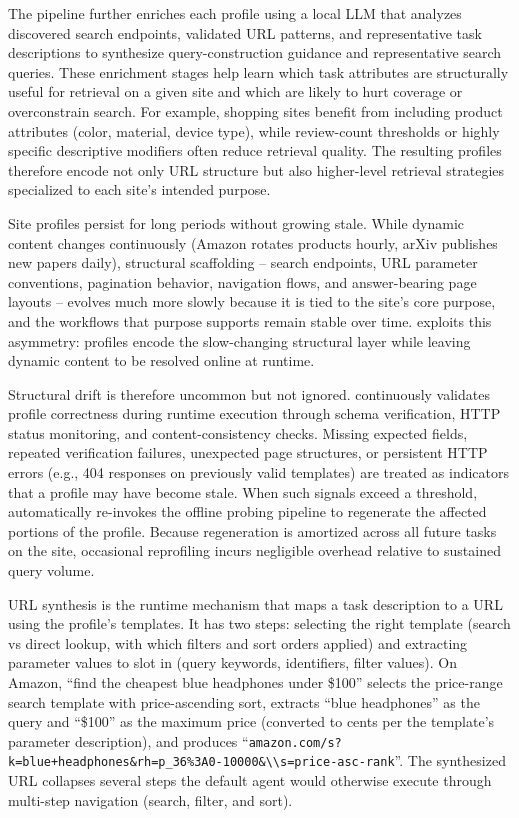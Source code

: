 The pipeline further enriches each profile using a local LLM that analyzes discovered search endpoints, validated URL patterns, and representative task descriptions to synthesize query-construction guidance and representative search queries. These enrichment stages help \sys{} learn which task attributes are structurally useful for retrieval on a given site and which are likely to hurt coverage or overconstrain search. For example, shopping sites benefit from including product attributes (color, material, device type), while review-count thresholds or highly specific descriptive modifiers often reduce retrieval quality. The resulting profiles therefore encode not only URL structure but also higher-level retrieval strategies specialized to each site's intended purpose.

 Site profiles persist for long periods without growing stale. While dynamic content changes continuously (Amazon rotates products hourly, arXiv publishes new papers daily), structural scaffolding -- search endpoints, URL parameter conventions, pagination behavior, navigation flows, and answer-bearing page layouts -- evolves much more slowly because it is tied to the site's core purpose, and the workflows that purpose supports remain stable over time. \sys exploits this asymmetry: profiles encode the slow-changing structural layer while leaving dynamic content to be resolved online at runtime.


Structural drift is therefore uncommon but not ignored.
\sys{} continuously validates profile correctness during runtime
execution through schema verification, HTTP status monitoring,
and content-consistency checks. Missing expected fields,
repeated verification failures, unexpected page structures, or
persistent HTTP errors (e.g., 404 responses on previously valid
templates) are treated as indicators that a profile may have
become stale. When such signals exceed a threshold, \sys{}
automatically re-invokes the offline probing pipeline to
regenerate the affected portions of the profile. Because
regeneration is amortized across all future tasks on the site,
occasional reprofiling incurs negligible overhead relative to
sustained query volume.


URL synthesis is the runtime mechanism that maps a task description to a URL using the profile's templates. It has two steps: selecting the right template (search vs direct lookup, with which filters and sort orders applied) and extracting parameter values to slot in (query keywords, identifiers, filter values). On Amazon, ``find the cheapest blue headphones under \$100'' selects the price-range search template with price-ascending sort, extracts ``blue headphones'' as the query and ``\$100'' as the maximum price (converted to cents per the template's parameter description), and produces ``{\nolinkurl{amazon.com/s?k=blue+headphones\&rh=p\_36\%3A0-10000\&\\s=price-asc-rank}}''. The synthesized URL collapses several steps the default agent would otherwise execute through multi-step navigation (search, filter, and sort).

